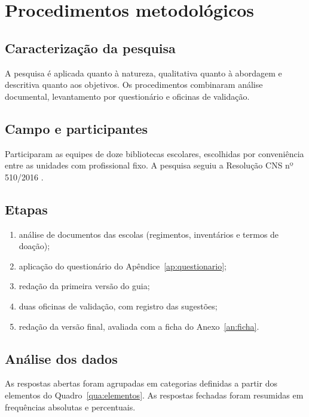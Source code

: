 \chapter{Procedimentos metodológicos}
\label{cap:metodologia}


\section{Caracterização da pesquisa}
A pesquisa é aplicada quanto à natureza, qualitativa quanto à abordagem e descritiva quanto aos objetivos. Os procedimentos combinaram análise documental, levantamento por questionário e oficinas de validação.

\section{Campo e participantes}

Participaram as equipes de doze bibliotecas escolares, escolhidas por conveniência entre as unidades com profissional fixo. A pesquisa seguiu a Resolução CNS nº 510/2016 \cite{brasil2016}.

\section{Etapas}
\begin{enumerate}[label=\arabic*)]
  \item análise de documentos das escolas (regimentos, inventários e termos de doação);
  \item aplicação do questionário do Apêndice~\ref{ap:questionario};
  \item redação da primeira versão do guia;
  \item duas oficinas de validação, com registro das sugestões;
  \item redação da versão final, avaliada com a ficha do Anexo~\ref{an:ficha}.
\end{enumerate}

\section{Análise dos dados}
As respostas abertas foram agrupadas em categorias definidas a partir dos elementos do Quadro~\ref{qua:elementos}. As respostas fechadas foram resumidas em frequências absolutas e percentuais.
